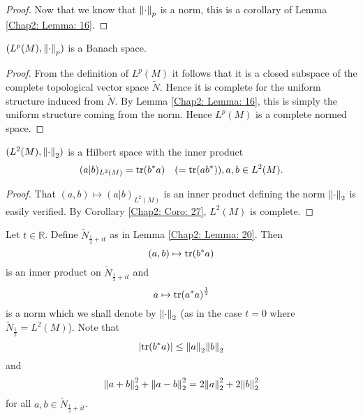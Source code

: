 \begin{proof}
    Now that we know that $\norm{\cdot}_p$ is a norm, this is a corollary of Lemma \ref{Chap2: Lemma: 16}.
\end{proof}
\begin{corollary}\label{Chap2: Coro: 27}
    $(L^p(M),\norm{\cdot}_p)$ is a Banach space. 
\end{corollary}
\begin{proof}
    From the definition of $L^p(M)$ it follows that it is a closed subspace of the complete topological vector space $\tilde{N}$. Hence it is complete for the uniform structure induced from $\tilde{N}$. By Lemma \ref{Chap2: Lemma: 16}, this is simply the uniform structure coming from the norm. Hence $L^p(M)$ is a complete normed space.
\end{proof}
\begin{corollary}
    $(L^2(M),\norm{\cdot}_2)$ is a Hilbert space with the inner product 
    \[
        (a|b)_{L^2(M)}=\tr(b^*a)\quad (=\tr(ab^*)),a,b\in L^2(M).
    \]
\end{corollary}
\begin{proof}
    That $(a,b)\mapsto (a|b)_{L^2(M)}$ is an inner product defining the norm $\norm{\cdot}_2$ is easily verified. By Corollary \ref{Chap2: Coro: 27}, $L^2(M)$ is complete.
\end{proof}
\begin{remark}
    Let $t\in \mathbb{R}$. Define $\tilde{N}_{\frac{1}{2}+it}$ as in Lemma \ref{Chap2: Lemma: 20}. Then 
    \[
        (a,b)\mapsto \tr(b^*a)
    \]
is an inner product on $\tilde{N}_{\frac{1}{2}+it}$ and 
\[
    a\mapsto \tr(a^*a)^\frac{1}{2}
\]
is a norm which we shall denote by $\norm{\cdot}_2$ (as in the case $t=0$ where $\tilde{N}_{\frac{1}{2}}=L^2(M)$). Note that 
\[
    \abs{\tr(b^*a)}\leq \norm{a}_2\norm{b}_2
\]
and 
\[
    \norm{a+b}_2^2+\norm{a-b}_2^2=2\norm{a}_2^2+2\norm{b}_2^2
\]
for all $a,b\in \tilde{N}_{\frac{1}{2}+it}$.
\end{remark}
% 